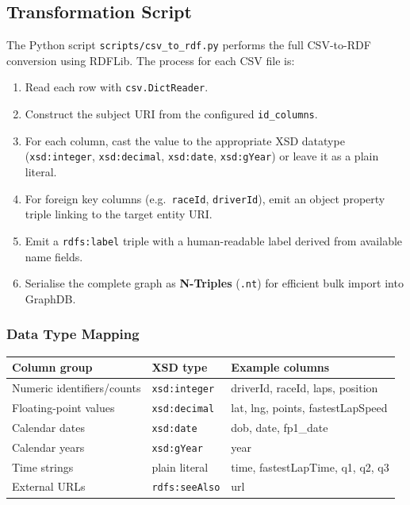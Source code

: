 \documentclass[12pt,a4paper]{article}
\begin{document}
\subsection{Transformation Script}

The Python script \texttt{scripts/csv\_to\_rdf.py} performs the full
CSV-to-RDF conversion using RDFLib. The process for each CSV file is:

\begin{enumerate}[leftmargin=2em]
  \item Read each row with \texttt{csv.DictReader}.
  \item Construct the subject URI from the configured \texttt{id\_columns}.
  \item For each column, cast the value to the appropriate XSD datatype
        (\texttt{xsd:integer}, \texttt{xsd:decimal}, \texttt{xsd:date},
        \texttt{xsd:gYear}) or leave it as a plain literal.
  \item For foreign key columns (e.g.\ \texttt{raceId}, \texttt{driverId}),
        emit an object property triple linking to the target entity URI.
  \item Emit a \texttt{rdfs:label} triple with a human-readable label derived
        from available name fields.
  \item Serialise the complete graph as \textbf{N-Triples} (\texttt{.nt}) for
        efficient bulk import into GraphDB.
\end{enumerate}

\subsubsection{Data Type Mapping}

\begin{center}
\begin{tabular}{@{}lll@{}}
\toprule
\textbf{Column group}      & \textbf{XSD type}     & \textbf{Example columns} \\
\midrule
Numeric identifiers/counts & \texttt{xsd:integer}  & driverId, raceId, laps, position \\
Floating-point values      & \texttt{xsd:decimal}  & lat, lng, points, fastestLapSpeed \\
Calendar dates             & \texttt{xsd:date}     & dob, date, fp1\_date \\
Calendar years             & \texttt{xsd:gYear}    & year \\
Time strings               & plain literal         & time, fastestLapTime, q1, q2, q3 \\
External URLs              & \texttt{rdfs:seeAlso} & url \\
\bottomrule
\end{tabular}
\end{center}
\end{document}
